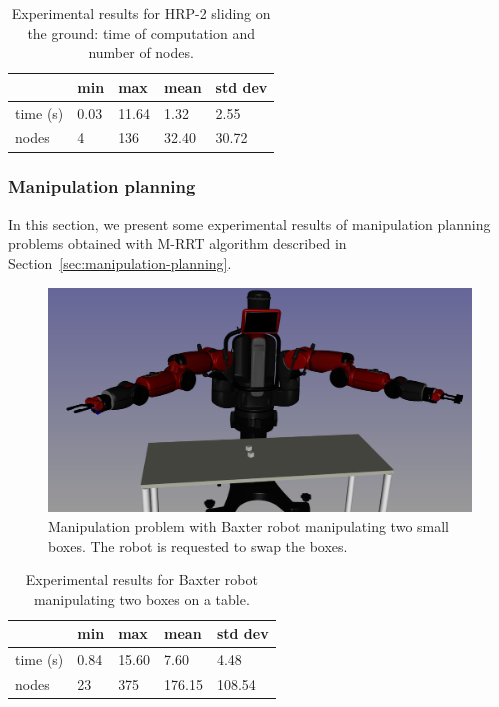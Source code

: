 \begin{table}
  \begin{center}
  \begin{tabular}{|l|l|l|l|l|}
    \hline
    & min & max & mean & std dev \\
    \hline
    time (s) & 0.03 & 11.64 & 1.32 & 2.55 \\
    nodes & 4 &  136 & 32.40 & 30.72\\
    \hline
  \end{tabular}
  \end{center}
  \caption{Experimental results for HRP-2 sliding on the ground: time of computation and number of nodes.}
  \label{tab:benchmark-hrp2}
\end{table}

\subsubsection{Manipulation planning}

In this section, we present some experimental results of manipulation planning
problems obtained with M-RRT algorithm described in Section~\ref{sec:manipulation-planning}.

\begin{figure}
  \begin{center}
    \includegraphics[width=\linewidth]{figures/baxter-manipulation-boxes}
  \end{center}
  \caption{Manipulation problem with Baxter robot manipulating two small boxes. The robot is requested to swap the boxes.}
  \label{fig:baxter-manipulation-boxes}
\end{figure}

\begin{table}
  \begin{center}
  \begin{tabular}{|l|l|l|l|l|}
    \hline
    & min & max & mean & std dev \\
    \hline
    time (s) & 0.84 & 15.60 & 7.60 & 4.48 \\
    nodes & 23 &  375 & 176.15 & 108.54 \\
    \hline
  \end{tabular}
  \end{center}
  \caption{Experimental results for Baxter robot manipulating two boxes on a table.}
  \label{tab:baxter-manipulation-boxes}
\end{table}

